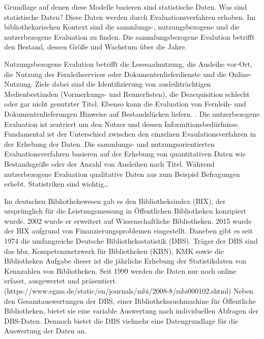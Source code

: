 Grundlage auf denen diese Modelle basieren sind statistische Daten. Was sind statistische Daten? Diese Daten werden durch Evaluationsverfahren erhoben. 
Im bibliothekarischen Kontext sind die sammlungs-, nutzungsbezogene und die nutzerbezogene Evaluation zu finden.  
Die sammlungsbezogene Evalution betrifft den Bestand, dessen Größe und Wachstum über die Jahre.

Nutzungsbezogene Evalution betrifft die Lesesaalnutzung, die Ausleihe vor-Ort, die Nutzung des Fernleihservices oder Dokumentenlieferdienste 
und die Online-Nutzung. Ziele dabei sind die Identifizierung von ausleihträchtigen Medienbeständen (Vormerkungs- und Rennerlisten), 
die Deacquisition schlecht oder gar nicht genutzter Titel. Ebenso kann die Evaluation von Fernleih- und Dokumentenlieferungen Hinweise auf Bestandslücken liefern. 
\cite[vgl.][255 ff.]{johannsen_jochen_bestands-_2015}. Die nutzerbezogene Evaluation ist zentriert um den Nutzer und dessen Informitionsbedürfnisse.
Fundamental ist der Unterschied zwischen den einzelnen Evaulationsverfahren in der Erhebung der Daten. 
Die sammlungs- und nutzungsorientierten Evaluationsverfahren basieren auf der Erhebung von quantitativen Daten wie Bestandsgröße oder der Anzahl von Ausleihen nach Titel. 
Während nutzerbezogene Evaluation qualitative Daten aus zum Beispiel Befragungen erhebt. \cite[vgl.][461 ff.]{blake_data_2004}
Statistriken sind wichtig…

Im deutschen Bibliothekswesen gab es den Bibliotheksindex (BIX), der ursprünglich 
für die Leistungsmessung in Öffentlichen Bibliotheken konzipiert wurde. 
2002 wurde er erweitert auf Wissenschaftliche Bibliotheken. 2015 wurde der BIX aufgrund von Finanzierungsproblemen eingestellt. 
Daneben gibt es seit 1974 die umfangreiche Deutsche Bibliotheksstatistik (DBS). 
Träger der DBS sind das hbz, Kompetenznetzwerk für Bibliotheken (KBN), KMK sowie die Bibliotheken
Aufgabe dieser ist die jährliche Erhebung der Statistikdaten von Kennzahlen von Bibliotheken. 
Seit 1999 werden die Daten nur noch online erfasst, ausgewertet und präsentiert. 
(https://www.egms.de/static/en/journals/mbi/2008-8/mbi000102.shtml)
Neben den Gesamtauswertungen der DBS, einer Bibliothekssuchmachine für Öffentliche Bibliotheken, 
bietet sie eine variable Auswertung nach individuellen Abfragen der DBS-Daten. 
Dennoch bietet die DBS vielmehr eine Datengrundlage für die Auswertung der Daten an.



